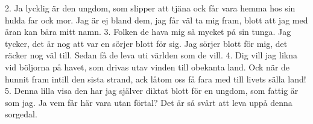 2.  Ja lycklig är den ungdom, som slipper att tjäna
    ock får vara hemma hos sin hulda far ock mor.
    Jag är ej bland dem,
    jag får väl ta mig fram,
    blott att jag med äran kan bära mitt namn.
3.  Folken de hava mig så mycket på sin tunga.
    Jag tycker, det är nog att var en sörjer blott för sig.
    Jag sörjer blott för mig,
    det räcker nog väl till.
    Sedan få de leva uti världen som de vill.
4.  Dig vill jag likna vid böljorna på havet,
    som drivas utav vinden till obekanta land.
    Ock när de hunnit fram
    intill den sista strand,
    ack låtom oss få fara med till livets sälla land!
5.  Denna lilla visa den har jag själver diktat
    blott för en ungdom, som fattig är som jag.
    Ja vem får här vara utan förtal?
    Det är så svårt att leva uppå denna sorgedal.
